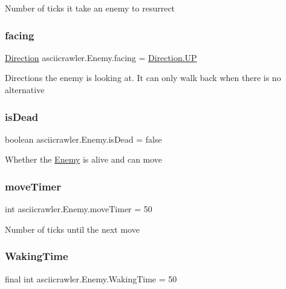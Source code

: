 Number of ticks it take an enemy to resurrect \mbox{\label{classasciicrawler_1_1Enemy_ab2fc6a3c9949c3d4317549f84a061ab9}} 
\subsubsection{\texorpdfstring{facing}{facing}}
{\footnotesize\ttfamily \hyperlink{enumasciicrawler_1_1Direction}{Direction} asciicrawler.\+Enemy.\+facing = \hyperlink{enumasciicrawler_1_1Direction_a6ddc24b03c5e790038cb48cf48ed8bb0}{Direction.\+UP}}

Directions the enemy is looking at. It can only walk back when there is no alternative \mbox{\label{classasciicrawler_1_1Enemy_aed37076b976c543c6099e7a4199c8a18}} 
\subsubsection{\texorpdfstring{is\+Dead}{isDead}}
{\footnotesize\ttfamily boolean asciicrawler.\+Enemy.\+is\+Dead = false}

Whether the \hyperlink{classasciicrawler_1_1Enemy}{Enemy} is alive and can move \mbox{\label{classasciicrawler_1_1Enemy_a4521663e829959a7c25327925b8a8f40}} 
\subsubsection{\texorpdfstring{move\+Timer}{moveTimer}}
{\footnotesize\ttfamily int asciicrawler.\+Enemy.\+move\+Timer = 50}

Number of ticks until the next move \mbox{\label{classasciicrawler_1_1Enemy_a03cbf40a5f16e3023b00ece3bfe67554}} 
\subsubsection{\texorpdfstring{Waking\+Time}{WakingTime}}
{\footnotesize\ttfamily final int asciicrawler.\+Enemy.\+Waking\+Time = 50\hspace{0.3cm}{\ttfamily [static]}}

